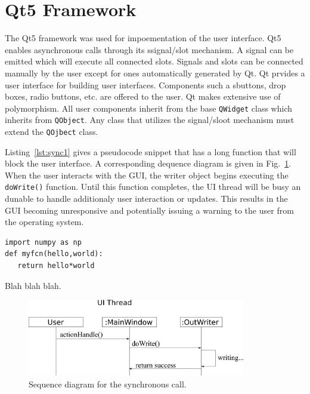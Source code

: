 \section{Qt5 Framework}
The Qt5 framework was used for impoementation of the user interface. Qt5 enables asynchronous calls through its ssignal/slot mechanism. A signal can be emitted which will execute all connected slots. Signals and slots can be connected manually by the user except for ones automatically generated by Qt. Qt prvides a user interface for building user interfaces. Components such a sbuttons, drop boxes, radio buttons, etc. are offered to the user. Qt makes extensive use of polymorphism. All user components inherit from the base \texttt{QWidget} class which inherits from \texttt{QObject}. Any class that utilizes the signal/sloot mechanism must extend the \texttt{QOjbect} class.

Listing~\ref{lst:sync1} gives a pseudocode snippet that has a long function that will block the user interface. A corresponding dequence diagram is given in Fig.~\ref{fig:sync1}. When the user interacts with the GUI, the writer object begins executing the \texttt{doWrite()} function. Until this function completes, the UI thread will be busy an dunable to handle additionaly user interaction or updates. This results in the GUI becoming unresponsive and potentially issuing a warning to the user from the operating system.

\begin{listing}
\begin{verbatim}
import numpy as np
def myfcn(hello,world):
   return hello*world
\end{verbatim}
\caption{Blah blah blah.}\label{lst:sync1}
\end{listing}

\begin{figure}[tb]
  \begin{center}
   \includegraphics[width=3.75in]{figs/writer_sync}
  \end{center}
  \caption{Sequence diagram for the synchronous call.}
\label{fig:sync1}
\end{figure}%

